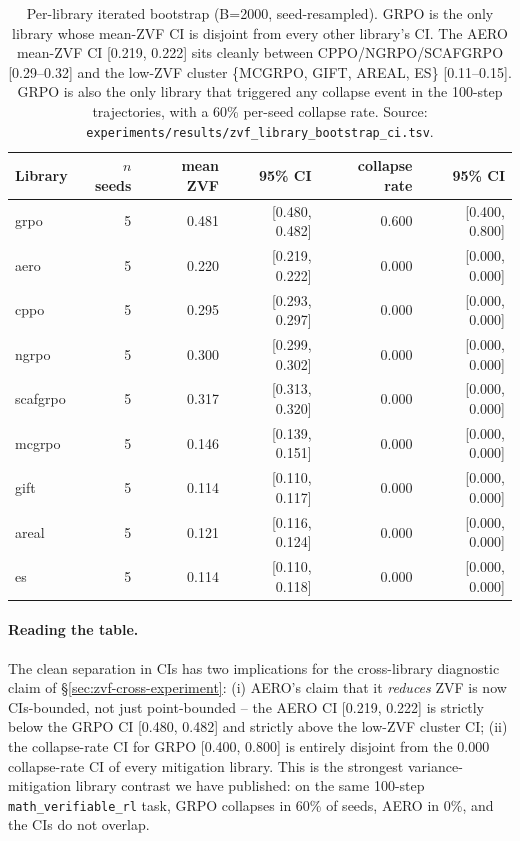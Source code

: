 \documentclass{article}
\begin{document}
\begin{table}[htbp]
\centering
\small
\begin{tabular}{lrrrrr}
\toprule
Library & $n$ seeds & mean ZVF & 95\% CI & collapse rate & 95\% CI \\
\midrule
grpo       & 5 & 0.481 & [0.480, 0.482] & 0.600 & [0.400, 0.800] \\
aero       & 5 & 0.220 & [0.219, 0.222] & 0.000 & [0.000, 0.000] \\
cppo       & 5 & 0.295 & [0.293, 0.297] & 0.000 & [0.000, 0.000] \\
ngrpo      & 5 & 0.300 & [0.299, 0.302] & 0.000 & [0.000, 0.000] \\
scafgrpo   & 5 & 0.317 & [0.313, 0.320] & 0.000 & [0.000, 0.000] \\
mcgrpo     & 5 & 0.146 & [0.139, 0.151] & 0.000 & [0.000, 0.000] \\
gift       & 5 & 0.114 & [0.110, 0.117] & 0.000 & [0.000, 0.000] \\
areal      & 5 & 0.121 & [0.116, 0.124] & 0.000 & [0.000, 0.000] \\
es         & 5 & 0.114 & [0.110, 0.118] & 0.000 & [0.000, 0.000] \\
\bottomrule
\end{tabular}
\caption{Per-library iterated bootstrap (B=2000, seed-resampled). GRPO is the
only library whose mean-ZVF CI is disjoint from every other library's CI.
The AERO mean-ZVF CI [0.219, 0.222] sits cleanly between CPPO/NGRPO/SCAFGRPO
[0.29--0.32] and the low-ZVF cluster \{MCGRPO, GIFT, AREAL, ES\}
[0.11--0.15]. GRPO is also the only library that triggered any collapse
event in the 100-step trajectories, with a 60\% per-seed collapse rate.
Source: \texttt{experiments/results/zvf\_library\_bootstrap\_ci.tsv}.}
\label{tab:zvf-library-bs}
\end{table}

\paragraph{Reading the table.}
The clean separation in CIs has two implications for the cross-library
diagnostic claim of \S\ref{sec:zvf-cross-experiment}:
(i) AERO's claim that it \emph{reduces} ZVF is now CIs-bounded, not just
point-bounded -- the AERO CI [0.219, 0.222] is strictly below the GRPO
CI [0.480, 0.482] and strictly above the low-ZVF cluster CI; (ii) the
collapse-rate CI for GRPO [0.400, 0.800] is entirely disjoint from the
0.000 collapse-rate CI of every mitigation library. This is the
strongest variance-mitigation library contrast we have published:
on the same 100-step \texttt{math\_verifiable\_rl} task, GRPO collapses
in 60\% of seeds, AERO in 0\%, and the CIs do not overlap.
\end{document}
